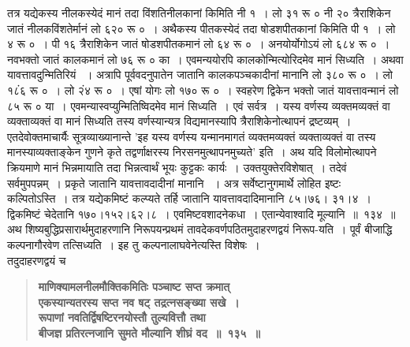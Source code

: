 \documentclass[11pt, openany]{book}
\begin{document}
\newpage

\begin{sloppypar}
\noindent तत्र यद्येकस्य नीलकस्येदं मानं तदा विंशतिनीलकानां किमिति नी १~। लो ३१ रू ० नी २० त्रैराशिकेन जातं नीलकविंशतेर्मानं लो ६२० रू ०~। अथैकस्य पीतकस्येदं तदा षोडशपीतकानां किमिति पी १~। लो ४ रू ०~। पी १६ त्रैराशिकेन जातं षोडशपीतकमानं लो ६४ रू ०~। अनयोर्योगोऽयं लो ६८४ रू ०~। नवभक्तो जातं कालकमानं लो ७६ रू ० का~। एवमन्ययोरपि कालकोन्मित्योरिदमेव मानं सिध्यति~। अथवा यावत्तावदुन्मितिरियं ~। अत्रापि पूर्ववदनुपातेन जातानि कालकपञ्चकादीनां मानानि लो ३८० रू ०~। लो १८ं६ रू ०~। लो २ं४ रू ०~। एषां योगः लो १७० रू ०~। स्वहरेण द्विकेन भक्तो जातं यावत्तावन्मानं लो ८५ रू ० या~। एवमन्यास्वप्युन्मितिष्विदमेव मानं सिध्यति~। एवं सर्वत्र~। यस्य वर्णस्य व्यक्तमव्यक्तं वा व्यक्ताव्यक्तं वा मानं सिध्यति तस्य वर्णस्यान्यत्र विद्यमानस्यापि त्रैराशिकेनोत्थापनं द्रष्टव्यम्~। एतदेवोक्तमाचार्यैः सूत्रव्याख्यानान्ते 'इह यस्य वर्णस्य यन्मानमागतं व्यक्तमव्यक्तं व्यक्ताव्यक्तं वा तस्य मानस्याव्यक्ताङ्केन गुणने कृते तद्वर्णाक्षरस्य निरसनमुत्थापनमुच्यते' इति~। अथ यदि विलोमोत्थापने क्रियमाणे मानं भिन्नमायाति तदा भिन्नत्वार्थं भूयः कुट्टकः कार्यः~। उक्तयुक्तेरविशेषात्~। तदेवं सर्वमुपपन्नम्~। प्रकृते जातानि यावत्तावदादीनां मानानि ~। अत्र सर्वेष्टानुगमार्थे लोहित इष्टः कल्पितोऽस्ति~। तत्र यद्येकमिष्टं कल्प्यते तर्हि जातानि यावत्तावदादिमानानि ८५।७६। ३१।४~। द्विकमिष्टं चेदेतानि १७०।१५२।६२।८~। एवमिष्टवशादनेकधा~। एतान्येवाश्वादि मूल्यानि~॥~१३४~॥\\

{\small अथ शिष्यबुद्धिप्रसारार्थमुदाहरणानि निरूपयन्प्रथमं तावदेकवर्णपठितमुदाहरणद्वयं निरूप-यति~। पूर्वं बीजाद्धि कल्पनागौरवेण तत्सिध्यति~। इह तु कल्पनालाघवेनेत्यस्ति विशेषः~।\\

तदुदाहरणद्वयं च\textendash }

 \label{9.135}
\begin{quote}
{\large \textbf{{\color{purple}माणिक्यामलनीलमौक्तिकमितिः पञ्चाष्ट सप्त क्रमात्\\
एकस्यान्यतरस्य सप्त नव षट् तद्रत्नसङ्ख्या सखे~।\\
रूपाणां नवतिर्द्विषष्टिरनयोस्तौ तुल्यवित्तौ तथा\\
बीजज्ञ प्रतिरत्नजानि सुमते मौल्यानि शीघ्रं वद~॥~१३५~॥}}}
\end{quote}

\end{sloppypar}
\end{document}
